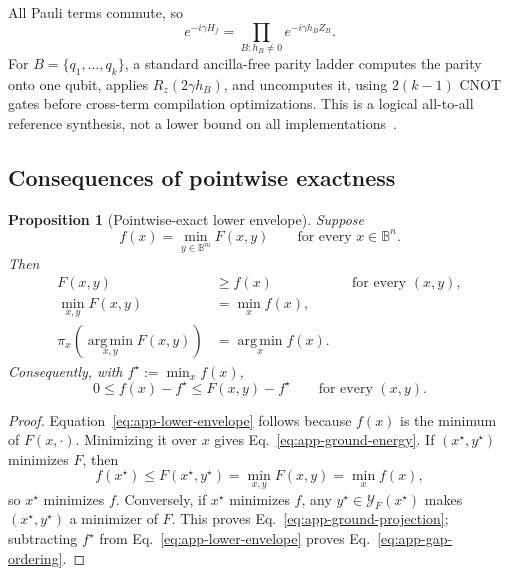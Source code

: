 \documentclass[a4paper,onecolumn,11pt,unpublished]{quantumarticle}
\newtheorem{proposition}[proposition]{Proposition}
\theoremstyle{remark}
\begin{document}
All Pauli terms commute, so
\begin{equation}
  e^{-i\gamma H_f}
  =\prod_{B:h_B\neq0}e^{-i\gamma h_BZ_B}.
  \label{eq:app-commuting-phase}
\end{equation}
For \(B=\{q_1,\ldots,q_k\}\), a standard ancilla-free parity ladder computes
the parity onto one qubit, applies \(R_z(2\gamma h_B)\), and uncomputes it,
using \(2(k-1)\) CNOT gates before cross-term compilation optimizations.  This
is a logical all-to-all reference synthesis, not a lower bound on all
implementations~\cite{CampbellDahl2022,Verchere2023}.

\subsection{Consequences of pointwise exactness}
\label{app:pointwise-consequences}

\begin{proposition}[Pointwise-exact lower envelope]
Suppose
\begin{equation}
  f(x)=\min_{y\in\mathbb{B}^m}F(x,y)
  \qquad\text{for every }x\in\mathbb{B}^n.
  \label{eq:app-pointwise-assumption}
\end{equation}
Then
\begin{align}
  F(x,y)&\geq f(x) &&\text{for every }(x,y),
  \label{eq:app-lower-envelope}\\
  \min_{x,y}F(x,y)&=\min_x f(x),
  \label{eq:app-ground-energy}\\
  \pi_x\!\left(\operatorname*{arg\,min}_{x,y}F(x,y)\right)
  &=\operatorname*{arg\,min}_x f(x).
  \label{eq:app-ground-projection}
\end{align}
Consequently, with \(f^\star:=\min_x f(x)\),
\begin{equation}
  0\leq f(x)-f^\star\leq F(x,y)-f^\star
  \qquad\text{for every }(x,y).
  \label{eq:app-gap-ordering}
\end{equation}
\end{proposition}

\begin{proof}
Equation~\eqref{eq:app-lower-envelope} follows because \(f(x)\) is the minimum
of \(F(x,\cdot)\).  Minimizing it over \(x\) gives
Eq.~\eqref{eq:app-ground-energy}.  If \((x^\star,y^\star)\) minimizes \(F\),
then
\[
  f(x^\star)\leq F(x^\star,y^\star)
  =\min_{x,y}F(x,y)=\min_x f(x),
\]
so \(x^\star\) minimizes \(f\).  Conversely, if \(x^\star\) minimizes \(f\),
any \(y^\star\in\mathcal{Y}_F(x^\star)\) makes
\((x^\star,y^\star)\) a minimizer of \(F\).  This proves
Eq.~\eqref{eq:app-ground-projection}; subtracting \(f^\star\) from
Eq.~\eqref{eq:app-lower-envelope} proves Eq.~\eqref{eq:app-gap-ordering}.
\end{proof}
\end{document}
